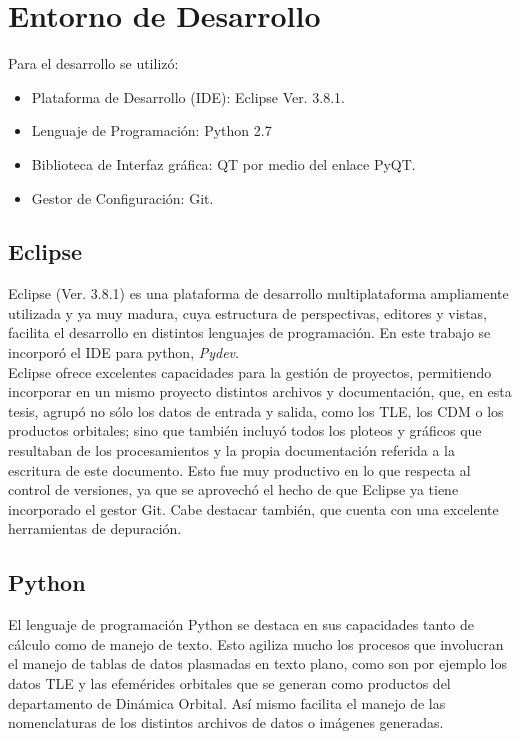 \section{Entorno de Desarrollo}\label{sec:entorno}

Para el desarrollo se utiliz\'o:\\
\begin{itemize}
 \item Plataforma de Desarrollo (\ac{IDE}): Eclipse Ver. 3.8.1.
 \item Lenguaje de Programaci\'on: Python 2.7
 \item Biblioteca de Interfaz gr\'afica: QT por medio del enlace PyQT.
 \item Gestor de Configuraci\'on: Git.
\end{itemize}

\subsection*{Eclipse}
Eclipse (Ver. 3.8.1) es una plataforma de desarrollo multiplataforma ampliamente utilizada y ya muy madura, cuya estructura de perspectivas, editores y vistas, facilita el desarrollo en distintos lenguajes de programaci\'on. En este trabajo se incorpor\'o el IDE para python, {\it{Pydev}}.\\

Eclipse ofrece excelentes capacidades para la gesti\'on de proyectos, permitiendo incorporar en un mismo proyecto distintos archivos y documentaci\'on, que, en esta tesis, agrup\'o no s\'olo los datos de entrada y salida, como los TLE, los CDM o los productos orbitales; sino que tambi\'en incluy\'o todos los ploteos y gr\'aficos que resultaban de los procesamientos y la propia documentaci\'on referida a la escritura de este documento. Esto fue muy productivo en lo que respecta al control de versiones, ya que se aprovech\'o el hecho de que Eclipse ya tiene incorporado el gestor Git.
Cabe destacar también, que cuenta con una excelente herramientas de depuraci\'on.\\

\subsection*{Python}
El lenguaje de programaci\'on Python se destaca en sus capacidades tanto de c\'alculo como de manejo de texto. Esto agiliza mucho los procesos que involucran el manejo de tablas de datos plasmadas en texto plano, como son por ejemplo los datos TLE y las efem\'erides orbitales que se generan como productos del departamento de Din\'amica Orbital. As\'i mismo facilita el manejo de las nomenclaturas de los distintos archivos de datos o im\'agenes generadas.\\

